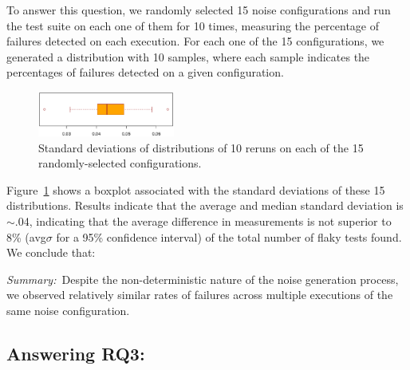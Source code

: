 \documentclass[conference]{IEEEtran}
\begin{document}
To answer this question, we randomly selected 15 noise configurations and run the test suite on each one of them for 10 times, measuring the percentage of failures detected on each execution. For each one of the 15 configurations, we generated a distribution with 10 samples, where each sample indicates the percentages of failures detected on a given configuration. 

\begin{figure}[t!]
    \centering
    \includegraphics[width=0.4\textwidth]{figs/sd-random.eps}
    \vspace{-2ex}
    \caption{\label{fig:standard-deviations}Standard deviations of distributions of 10 reruns on each of the 15 randomly-selected configurations.}
    \vspace{-3ex}
\end{figure}

Figure~\ref{fig:standard-deviations} shows a boxplot associated with the standard deviations of these 15 distributions. Results indicate that the average and median standard deviation is $\sim$.04, indicating that the average difference in measurements is not superior to 8\% (avg\textpm$\sigma$ for a 95\% confidence interval) of the total number of flaky tests found. We conclude that:

\begin{center}
\begin{tcolorbox}[enhanced,width=3.4in,center upper,drop shadow southwest,sharp corners]
\emph{Summary:}~Despite the non-deterministic nature of the noise generation process, we observed relatively similar rates of failures across multiple executions of the same noise configuration. 
\end{tcolorbox}
\end{center}


\subsection{Answering RQ3: \rqthree}
\end{document}
